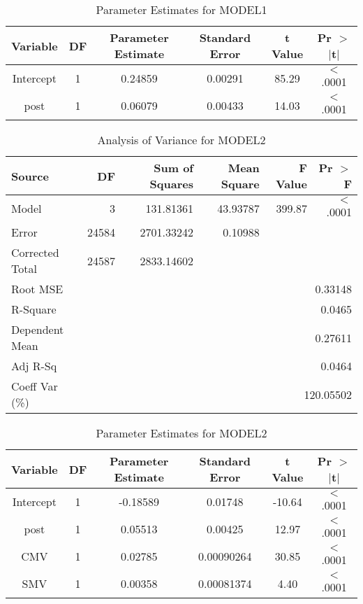 \documentclass[12pt,english]{article}
\begin{document}
\begin{table}[h]
\centering
\caption{Parameter Estimates for MODEL1}
\label{tab:estimates}
\begin{tabular}{|c|c|c|c|c|c|}
\hline
Variable & DF & Parameter Estimate & Standard Error & t Value & Pr $>$ $|$t$|$ \\
\hline
Intercept & 1 & 0.24859 & 0.00291 & 85.29 & $<$.0001 \\
post & 1 & 0.06079 & 0.00433 & 14.03 & $<$.0001 \\
\hline
\end{tabular}
\end{table}




\begin{table}[h]
\centering
\caption{Analysis of Variance for MODEL2}
\label{tab:anova}
\begin{tabular}{lrrrrr}
\hline
Source & DF & Sum of Squares & Mean Square & F Value & Pr $>$ F \\
\hline
Model & 3 & 131.81361 & 43.93787 & 399.87 & $<$.0001 \\
Error & 24584 & 2701.33242 & 0.10988 \\
Corrected Total & 24587 & 2833.14602 \\
\hline
Root MSE & \multicolumn{5}{r}{0.33148} \\
R-Square & \multicolumn{5}{r}{0.0465} \\
Dependent Mean & \multicolumn{5}{r}{0.27611} \\
Adj R-Sq & \multicolumn{5}{r}{0.0464} \\
Coeff Var (\%)& \multicolumn{5}{r}{120.05502} \\
\hline
\end{tabular}
\end{table}


\begin{table}[h]
\centering
\caption{Parameter Estimates for MODEL2}
\label{tab:estimates}
\begin{tabular}{|c|c|c|c||c||c|}
\hline
Variable & DF & Parameter Estimate & Standard Error & t Value & Pr $>$ $|$t$|$\\
\hline
Intercept & 1 & -0.18589 & 0.01748 & -10.64 & $<$.0001 \\
post & 1 & 0.05513 & 0.00425 & 12.97 & $<$.0001 \\
CMV & 1 & 0.02785 & 0.00090264 & 30.85 & $<$.0001 \\
SMV & 1 & 0.00358& 0.00081374 & 4.40 & $<$.0001 \\
\hline
\end{tabular}
\end{table}
\end{document}

